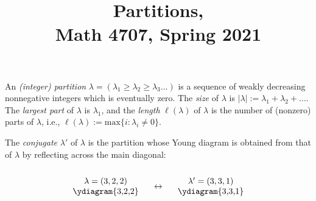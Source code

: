 \documentclass[11pt]{article}
\title{Partitions, \\ Math 4707, Spring 2021}
\date{}
\begin{document}
\maketitle

\thispagestyle{empty}

\vspace{-0.85cm}

An \emph{(integer) partition} $\lambda = (\lambda_1 \geq \lambda_2 \geq \lambda_3 \ldots)$ is a sequence of weakly decreasing nonnegative integers which is eventually zero. The \emph{size} of $\lambda$ is $|\lambda| := \lambda_1+\lambda_2+...$. The \emph{largest part} of $\lambda$ is $\lambda_1$, and the \emph{length} $\ell(\lambda)$ of $\lambda$ is the number of (nonzero) parts of $\lambda$, i.e., $\ell(\lambda) := \mathrm{max}\{i\colon \lambda_i \neq 0\}$.

The \emph{conjugate} $\lambda'$ of $\lambda$ is the partition whose Young diagram is obtained from that of $\lambda$ by reflecting across the main diagonal:

\vspace{-0.75cm}
\[ \parbox{1.5in}{\begin{center}$\lambda=(3,2,2)$ \\  \ydiagram{3,2,2} \end{center}} \leftrightarrow \parbox{1.5in}{\begin{center} $\lambda'=(3,3,1)$ \\  \ydiagram{3,3,1} \end{center}} \]


\vspace{-0.75cm}
\end{document}
